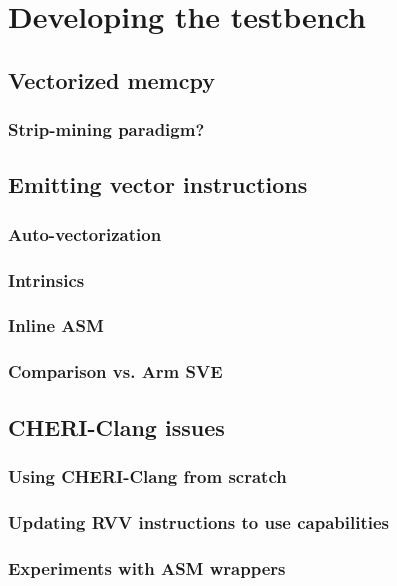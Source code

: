 \section{Developing the testbench}\label{chap:software:sec:testbench}

\subsection{Vectorized memcpy}

\subsubsection{Strip-mining paradigm?}

\subsection{Emitting vector instructions}
\subsubsection{Auto-vectorization}
\subsubsection{Intrinsics}
\subsubsection{Inline ASM}
\subsubsection{Comparison vs. Arm SVE}

\subsection{CHERI-Clang issues}
\subsubsection{Using CHERI-Clang from scratch}
\subsubsection{Updating RVV instructions to use capabilities}
\subsubsection{Experiments with ASM wrappers}
